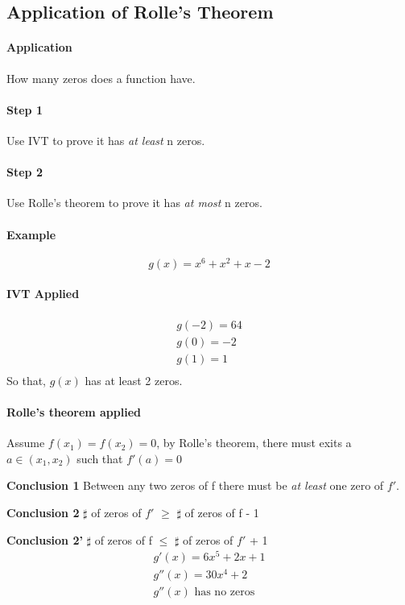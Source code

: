 \documentclass{article}
\begin{document}
	\subsection{Application of Rolle's Theorem}
	\paragraph{Application} How many zeros does a function have.
	\paragraph{Step 1} Use IVT to prove it has \emph{at least} n zeros.
	\paragraph{Step 2} Use Rolle's theorem to prove it has \emph{at most} n zeros.
	\paragraph{Example}
	\[
	g(x) = x^6 + x^2 + x - 2
	\]
	\paragraph{IVT Applied}
	\begin{align*}
		g(-2) = 64 \\
		g(0) = -2 \\
		g(1) = 1\\
	\end{align*}
	So that, $g(x)$ has at least 2 zeros.
	
	\paragraph{Rolle's theorem applied}
	Assume $f(x_1) = f(x_2) = 0$, by Rolle's theorem, there must exits a $a \in (x_1, x_2)$ such that $f'(a) = 0$
	
	\textbf{Conclusion 1} Between any two zeros of f there must be \emph{at least} one zero of $f'$.	
	
	\textbf{Conclusion 2} $\sharp$ of zeros of $f'$ $\geq$ $\sharp$ of zeros of f - 1
	
	\textbf{Conclusion 2'} $\sharp$ of zeros of f $\leq$ $\sharp$ of zeros of $f'$ + 1
	\begin{align*}
		g'(x) = 6x^5 + 2x + 1\\
		g''(x) = 30x^4 + 2 \\
		g''(x) \text{ has no zeros}
	\end{align*}
	
\end{document}
